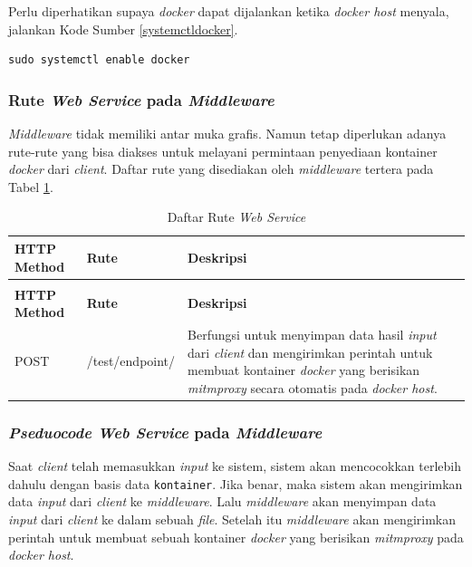 Perlu diperhatikan supaya \textit{docker} dapat dijalankan ketika \textit{docker host} menyala, jalankan Kode Sumber \ref{systemctldocker}.
\begin{lstlisting}[frame=single,tabsize=2,breaklines,captionpos=b,caption=Command untuk installasi Flask,language=Python,label=systemctldocker]
sudo systemctl enable docker
\end{lstlisting}

\subsubsection{Rute \textit{Web Service} pada \textit{Middleware}}
\textit{Middleware} tidak memiliki antar muka grafis. Namun tetap diperlukan adanya rute-rute yang bisa diakses untuk melayani permintaan penyediaan kontainer \textit{docker} dari \textit{client}. Daftar rute yang disediakan oleh \textit{middleware} tertera pada Tabel \ref{tabelRuteWebServiceDockerHost}.\\
\begin{longtable}{|p{}|p{}|p{}|p{}|} %
	
	\caption{Daftar Rute \textit{Web Service}} \label{tabelRuteWebServiceDockerHost} \\
	\hline
	\textbf{HTTP Method} & \textbf{Rute} & \textbf{Deskripsi} \\ \hline
	
	\endfirsthead
	\caption[]{Daftar Rute \textit{Web Service}}  \\
	\hline
	\textbf{HTTP Method} & \textbf{Rute} & \textbf{Deskripsi}  \\ \hline
	
	\endhead
	\endfoot
	\endlastfoot
	
	POST & /test/endpoint/ & Berfungsi untuk menyimpan data hasil \textit{input} dari \textit{client} dan mengirimkan perintah untuk membuat kontainer \textit{docker} yang berisikan \textit{mitmproxy} secara otomatis pada \textit{docker host}.\\ \hline
\end{longtable}

\subsubsection{\textit{Pseduocode Web Service} pada \textit{Middleware}}
Saat \textit{client} telah memasukkan \textit{input} ke sistem, sistem akan mencocokkan terlebih dahulu dengan basis data \texttt{kontainer}. Jika benar, maka sistem akan mengirimkan data \textit{input} dari \textit{client} ke \textit{middleware}. Lalu \textit{middleware} akan menyimpan data \textit{input} dari \textit{client} ke dalam sebuah \textit{file}. Setelah itu \textit{middleware} akan mengirimkan perintah untuk membuat sebuah kontainer \textit{docker} yang berisikan \textit{mitmproxy} pada \textit{docker host}.

